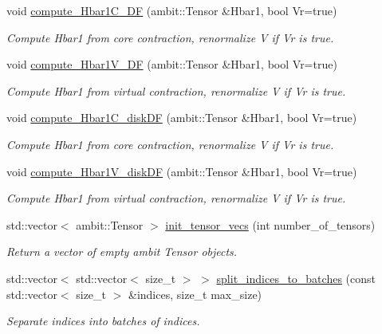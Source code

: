 \begin{DoxyCompactItemize}
void \mbox{\hyperlink{classforte_1_1_s_a___m_r_p_t2_a085abee58e89aa1ee5bb3c74938ec129}{compute\+\_\+\+Hbar1\+C\+\_\+\+DF}} (ambit\+::\+Tensor \&Hbar1, bool Vr=true)
\begin{DoxyCompactList}\small\item\em Compute Hbar1 from core contraction, renormalize V if Vr is true. \end{DoxyCompactList}\item 
void \mbox{\hyperlink{classforte_1_1_s_a___m_r_p_t2_a0f64bc015ef779f89f4f2c4ae5a52b57}{compute\+\_\+\+Hbar1\+V\+\_\+\+DF}} (ambit\+::\+Tensor \&Hbar1, bool Vr=true)
\begin{DoxyCompactList}\small\item\em Compute Hbar1 from virtual contraction, renormalize V if Vr is true. \end{DoxyCompactList}\item 
void \mbox{\hyperlink{classforte_1_1_s_a___m_r_p_t2_aa47effe7dce7d3101785027d4f2f7b9e}{compute\+\_\+\+Hbar1\+C\+\_\+disk\+DF}} (ambit\+::\+Tensor \&Hbar1, bool Vr=true)
\begin{DoxyCompactList}\small\item\em Compute Hbar1 from core contraction, renormalize V if Vr is true. \end{DoxyCompactList}\item 
void \mbox{\hyperlink{classforte_1_1_s_a___m_r_p_t2_ac8391bf7b03228fa77b77ab7a6cfd00e}{compute\+\_\+\+Hbar1\+V\+\_\+disk\+DF}} (ambit\+::\+Tensor \&Hbar1, bool Vr=true)
\begin{DoxyCompactList}\small\item\em Compute Hbar1 from virtual contraction, renormalize V if Vr is true. \end{DoxyCompactList}\item 
std\+::vector$<$ ambit\+::\+Tensor $>$ \mbox{\hyperlink{classforte_1_1_s_a___m_r_p_t2_abe83ad82ae14b4d1d57ec1f6f24f580f}{init\+\_\+tensor\+\_\+vecs}} (int number\+\_\+of\+\_\+tensors)
\begin{DoxyCompactList}\small\item\em Return a vector of empty ambit Tensor objects. \end{DoxyCompactList}\item 
std\+::vector$<$ std\+::vector$<$ size\+\_\+t $>$ $>$ \mbox{\hyperlink{classforte_1_1_s_a___m_r_p_t2_a34195dd921dbce47b56deec123515d7e}{split\+\_\+indices\+\_\+to\+\_\+batches}} (const std\+::vector$<$ size\+\_\+t $>$ \&indices, size\+\_\+t max\+\_\+size)
\begin{DoxyCompactList}\small\item\em Separate indices into batches of indices. \end{DoxyCompactList}\end{DoxyCompactItemize}
